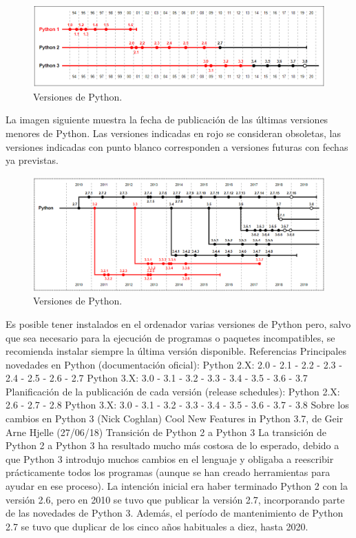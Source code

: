 \begin{figure}[h!]
  	\centering
	\includegraphics[width=\textwidth]{FotosPaginasWebHeliostatos/unnamed(7).png}
	\caption{Versiones de Python.
	\label{fig:FotosPaginasWebHeliostatos/unnamed(7).png}}
\end{figure}

La imagen siguiente muestra la fecha de publicación de las últimas versiones menores de Python. Las versiones indicadas en rojo se consideran obsoletas, las versiones indicadas con punto blanco corresponden a versiones futuras con fechas ya previstas.

\begin{figure}[h!]
  	\centering
	\includegraphics[width=\textwidth]{FotosPaginasWebHeliostatos/unnamed(8).png}
	\caption{Versiones de Python.
	\label{fig:FotosPaginasWebHeliostatos/unnamed(8).png}}
\end{figure}

Es posible tener instalados en el ordenador varias versiones de Python pero, salvo que sea necesario para la ejecución de programas o paquetes incompatibles, se recomienda instalar siempre la última versión disponible.
Referencias
Principales novedades en Python (documentación oficial):
Python 2.X: 2.0 - 2.1 - 2.2 - 2.3 - 2.4 - 2.5 - 2.6 - 2.7
Python 3.X: 3.0 - 3.1 - 3.2 - 3.3 - 3.4 - 3.5 - 3.6 - 3.7
Planificación de la publicación de cada versión (release schedules):
Python 2.X: 2.6 - 2.7 - 2.8
Python 3.X: 3.0 - 3.1 - 3.2 - 3.3 - 3.4 - 3.5 - 3.6 - 3.7 - 3.8
Sobre los cambios en Python 3 (Nick Coghlan)
Cool New Features in Python 3.7, de Geir Arne Hjelle (27/06/18)
Transición de Python 2 a Python 3
La transición de Python 2 a Python 3 ha resultado mucho más costosa de lo esperado, debido a que Python 3 introdujo muchos cambios en el lenguaje y obligaba a reescribir prácticamente todos los programas (aunque se han creado herramientas para ayudar en ese proceso).
La intención inicial era haber terminado Python 2 con la versión 2.6, pero en 2010 se tuvo que publicar la versión 2.7, incorporando parte de las novedades de Python 3. Además, el período de mantenimiento de Python 2.7 se tuvo que duplicar de los cinco años habituales a diez, hasta 2020.

